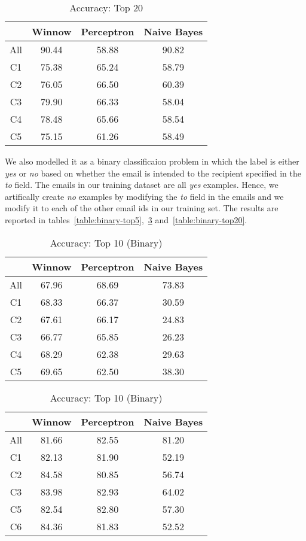 \documentclass[senior,oneside]{UIUC}
\begin{document}
\begin{table}
\centering
\begin{tabular}{c | c c c}
\hline \hline
 & Winnow & Perceptron & Naive Bayes \\ [0.5ex]
\hline
All & 90.44 & 58.88 & 90.82 \\
C1 & 75.38 & 65.24 & 58.79 \\
C2 & 76.05 & 66.50 & 60.39 \\
C3 & 79.90 & 66.33 & 58.04 \\
C4 & 78.48 & 65.66 & 58.54 \\
C5 & 75.15 & 61.26 & 58.49 \\
\end{tabular}
\caption{Accuracy: Top 20}
\label{table:normal-top20}
\end{table}

We also modelled it as a binary classificaion problem in which the label is either \emph{yes} or \emph{no} based on whether the email is intended to the recipient specified in the \emph{to} field. The emails in our training dataset are all \emph{yes} examples. Hence, we artifically create \emph{no} examples by modifying the \emph{to} field in the emails and we modify it to each of the other email ids in our training set. The results are reported in tables~\ref{table:binary-top5},~\ref{table:binary-top10} and~\ref{table:binary-top20}.

\begin{table}
\parbox{.45\linewidth}{
\centering
\begin{tabular}{c | c c c}
\hline \hline
 & Winnow & Perceptron & Naive Bayes \\ [0.5ex]
\hline
All & 67.96 & 68.69 & 73.83 \\
C1 & 68.33 & 66.37 & 30.59 \\
C2 & 67.61 & 66.17 & 24.83 \\
C3 & 66.77 & 65.85 & 26.23 \\
C4 & 68.29 & 62.38 & 29.63 \\
C5 & 69.65 & 62.50 & 38.30 \\
\end{tabular}
\caption{Accuracy: Top 5 (Binary)}
\label{table:binary-top5}
}
\hfill
\parbox{.45\linewidth}{
\centering
\begin{tabular}{c | c c c}
\hline \hline
 & Winnow & Perceptron & Naive Bayes \\ [0.5ex]
\hline
All & 81.66 & 82.55 & 81.20 \\
C1 & 82.13 & 81.90 & 52.19 \\
C2 & 84.58 & 80.85 & 56.74 \\
C3 & 83.98 & 82.93 & 64.02 \\
C5 & 82.54 & 82.80 & 57.30 \\
C6 & 84.36 & 81.83 & 52.52 \\
\end{tabular}
\caption{Accuracy: Top 10 (Binary)}
\label{table:binary-top10}
}
\end{table}
\end{document}
